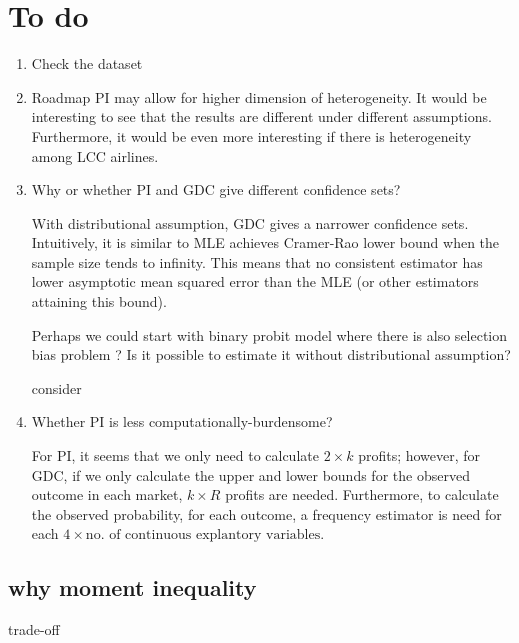 \documentclass[a4paper]{article}
\begin{document}
{\color{violet}
\section*{To do}
\begin{enumerate}
\item Check the dataset

\item Roadmap
PI may allow for higher dimension of heterogeneity. It would be interesting to see that the results are different under different assumptions. Furthermore, it would be even more interesting if there is heterogeneity among LCC airlines.


\item Why or whether PI and GDC give different confidence sets?

With distributional assumption, GDC gives a narrower confidence sets. Intuitively, it is similar to MLE achieves Cramer-Rao lower bound when the sample size tends to infinity. This means that no consistent estimator has lower asymptotic mean squared error than the MLE (or other estimators attaining this bound).

Perhaps we could start with binary probit model where there is also selection bias problem ? Is it possible to estimate it without distributional assumption?

consider \cite{andrews2013inference}

\item Whether PI is less computationally-burdensome?

For PI, it seems that we only need to calculate $2\times k$ profits; however, for GDC, if we only calculate the upper and lower bounds for the observed outcome in each market, $k \times R$ profits are needed. Furthermore, to calculate the observed probability, for each outcome, a frequency estimator is need for each $4 \times \mbox{no. of continuous explantory variables}$. 

\end{enumerate}
}
\subsection*{why moment inequality}

trade-off
\end{document}
